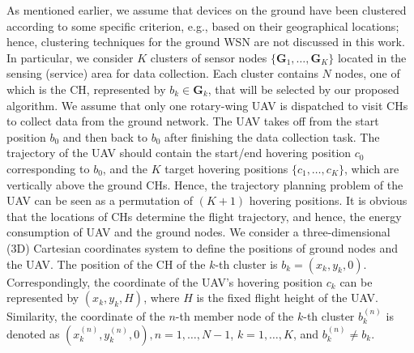 \documentclass[journal]{IEEEtran}
\begin{document}
	As mentioned earlier, we assume that devices on the ground have been clustered according to some specific criterion, e.g., based on their geographical locations; hence, clustering techniques for the ground WSN are not discussed in this work.
	In particular, we consider $K$ clusters of sensor nodes  $\{\bm{G}_1,\dots, \bm{G}_K\}$ located in the sensing (service) area for data collection. Each cluster contains $N$ nodes, one of which is the CH, represented by $b^{}_k\in \bm{G}_k$, that will be selected by our proposed algorithm. We assume that only one rotary-wing UAV is dispatched to visit CHs to collect data from the ground network. The UAV takes off from the start position $b_0$ and then back to $b_0$ after finishing the data collection task. The trajectory of the UAV should contain the start/end hovering position $c_0$ corresponding to $b_0$, and the $K$ target hovering positions $\{c_1,\dots, c_K\}$, which are vertically above the ground CHs. Hence, the trajectory planning problem of the UAV can be seen as a permutation of $(K+1)$ hovering positions. It is obvious that the locations of CHs determine the flight trajectory, and hence, the energy consumption of UAV and the ground nodes. We consider a three-dimensional (3D) Cartesian coordinates system to define the positions of ground nodes and the UAV. The position of the CH of the $k$-th cluster is $b_k = \left(x_k, y_k, 0\right)$. Correspondingly, the coordinate of the UAV's hovering position $c_k$ can be represented by $\left(x_k, y_k, H\right)$, where $H$ is the fixed flight height of the UAV. Similarity, the coordinate of the $n$-th member node of the $k$-th cluster $b_k^{(n)}$ is denoted as $\left(x_k^{(n)}, y_k^{(n)}, 0\right), n=1,\dots,N-1$, $k=1,\dots,K$, and $b_k^{(n)} \neq b_k$.
	

	
\end{document}
